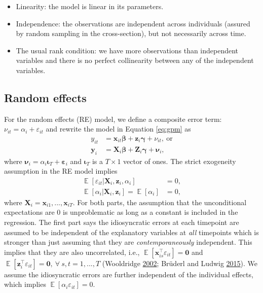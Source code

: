 \documentclass[
  12pt,
  a4paper]{article}
\providecommand{\tightlist}{%
  \setlength{\itemsep}{0pt}\setlength{\parskip}{0pt}}
\DeclareMathOperator{\E}{\mathbb{E}}
\begin{document}
\begin{itemize}
\tightlist
\item
  Linearity: the model is linear in its parameters.
\item
  Independence: the observations are independent across individuals
  (assured by random sampling in the cross-section), but not necessarily
  across time.
\item
  The usual rank condition: we have more observations than independent
  variables and there is no perfect collinearity between any of the
  independent variables.
\end{itemize}

\hypertarget{re}{%
\subsection{Random effects}\label{re}}

For the random effects (RE) model, we define a composite error term:
\(\nu_{it} = \alpha_{i} + \varepsilon_{it}\) and rewrite the model in
Equation \eqref{eq:gpm} as \begin{align}
y_{it} & = \bm{x}_{it}\bm{\beta} + \bm{z}_{i}\bm{\gamma} + \nu_{it}, \ \text{or} \\
\bm{y}_{i} & = \bm{X}_{i}\bm{\beta} + \bm{Z}_{i}\bm{\gamma} + \bm{\nu}_{i},
\end{align} where
\(\bm{\nu}_{i} = \alpha_{i} \bm{\iota}_{T} + \bm{\varepsilon}_{i}\) and
\(\bm{\iota}_{T}\) is a \(T \times 1\) vector of ones. The strict
exogeneity assumption in the RE model implies \begin{align}
\E[\varepsilon_{it} | \bm{X}_{i}, \bm{z}_{i}, \alpha_{i}] & = 0, \\
\E[\alpha_{i} |\bm{X}_{i}, \bm{z}_{i}] = \E[\alpha_{i}] & = 0,
\end{align} where \(\bm{X}_{i} = \bm{x}_{i1}, ..., \bm{x}_{iT}\). For
both parts, the assumption that the unconditional expectations are 0 is
unproblematic as long as a constant is included in the regression. The
first part says the idiosyncratic errors at each timepoint are assumed
to be independent of the explanatory variables at \textit{all}
timepoints which is stronger than just assuming that they are
\textit{contemporaneously} independent. This implies that they are also
uncorrelated, i.e.,
\(\E[\bm{x}_{is}^{\intercal}\varepsilon_{it}] = \bm{0}\) and
\(\E[\bm{z}_{i}^{\intercal}\varepsilon_{it}] = \bm{0}, \ \forall \ s, t = 1, ..., T\)
(Wooldridge \protect\hyperlink{ref-Wooldridge2002}{2002}; Brüderl and
Ludwig \protect\hyperlink{ref-Bruederl2015}{2015}). We assume the
idiosyncratic errors are further independent of the individual effects,
which implies \(\E[\alpha_{i}\varepsilon_{it}] = 0\).
\end{document}
